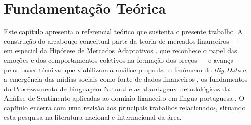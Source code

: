 
\chapter{Fundamentação Teórica} \label{Cap:Fundamentacao_Teorica}

Este capítulo apresenta o referencial teórico que sustenta o presente trabalho. A construção do arcabouço conceitual parte da teoria de mercados financeiros --- em especial da Hipótese de Mercados Adaptativos \cite{lo2004}, que reconhece o papel das emoções e dos comportamentos coletivos na formação dos preços --- e avança pelas bases técnicas que viabilizam a análise proposta: o fenômeno do \textit{Big Data} e a emergência das mídias sociais como fonte de dados financeiros \cite{laney2001,bollen2011}, os fundamentos do Processamento de Linguagem Natural \cite{caseli2024cap1,jurafsky2026} e as abordagens metodológicas da Análise de Sentimento aplicadas ao domínio financeiro em língua portuguesa
\cite{kearney2014,santos2023finbert}. O capítulo encerra com uma revisão dos principais trabalhos relacionados, situando esta pesquisa na literatura nacional e internacional da área.










